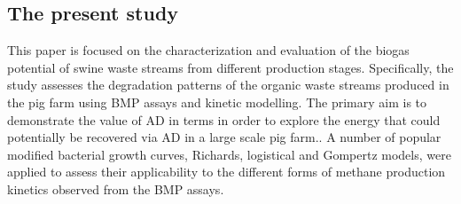 \subsection{The present study}
This paper is focused on the characterization and evaluation of the biogas potential of swine waste streams from different production stages. Specifically, the study assesses the degradation patterns of the organic waste streams produced in the pig farm using BMP assays and kinetic modelling. The primary aim is to demonstrate the value of AD in terms in order to explore the energy that could potentially be recovered via AD in a large scale pig farm.. A number of popular modified bacterial growth curves, Richards, logistical and Gompertz models, were applied to assess their applicability to the different forms of methane production kinetics observed from the BMP assays.